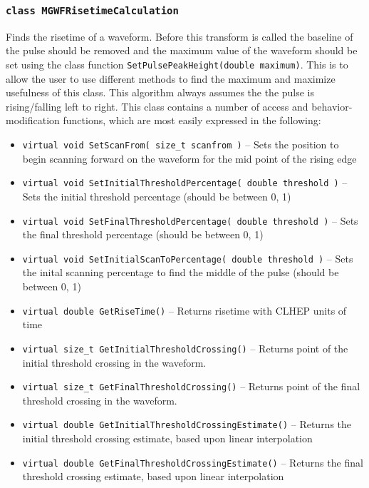 			\subsubsection{\lstinline!class MGWFRisetimeCalculation!}
Finds the risetime of a waveform.  Before this transform is called the baseline of the pulse should be removed and the maximum value of the waveform should be set using the class function \lstinline!SetPulsePeakHeight(double maximum)!.  This is to allow the user to use different methods to find the maximum and maximize usefulness of this class. This algorithm always assumes the the pulse is rising/falling left to right.  This class contains a number of access and behavior-modification functions, which are most easily expressed in the following:
				\begin{itemize} 
				    \item \lstinline!virtual void SetScanFrom( size_t scanfrom )! -- Sets the position to begin scanning forward on the waveform for the mid point of the rising edge
				    \item \lstinline!virtual void SetInitialThresholdPercentage( double threshold )! --     Sets the initial threshold percentage (should be between 0, 1)
				    \item \lstinline!virtual void SetFinalThresholdPercentage( double threshold )! --     Sets the final threshold percentage (should be between 0, 1)
				    \item \lstinline!virtual void SetInitialScanToPercentage( double threshold )! -- Sets the inital scanning percentage to find the middle of the pulse (should be between 0, 1)
				    \item \lstinline!virtual double GetRiseTime()! --     Returns risetime with CLHEP units of time
				    \item \lstinline!virtual size_t GetInitialThresholdCrossing()! -- Returns point of the initial threshold crossing in the waveform.
				    \item \lstinline!virtual size_t GetFinalThresholdCrossing()! --     Returns point of the final threshold crossing in the waveform.
				    \item \lstinline!virtual double GetInitialThresholdCrossingEstimate()! --     Returns the initial threshold crossing estimate, based upon linear interpolation 
				    \item \lstinline!virtual double GetFinalThresholdCrossingEstimate()! -- Returns the final threshold crossing estimate, based upon linear interpolation 
				\end{itemize}				
